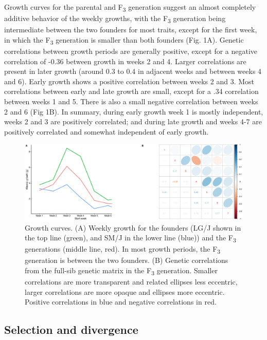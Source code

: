 \begin{refsection}
Growth curves for the parental and F\textsubscript{3} generation suggest
an almost completely additive behavior of the weekly growths, with the
F\textsubscript{3} generation being intermediate between the two
founders for most traits, except for the first week, in which the
F\textsubscript{3} generation is smaller than both founders (Fig. 1A).
Genetic correlations between growth periods are generally positive,
except for a negative correlation of -0.36 between growth in weeks 2 and
4. Larger correlations are present in later growth (around 0.3 to 0.4 in
adjacent weeks and between weeks 4 and 6). Early growth shows a positive
correlation between weeks 2 and 3. Most correlations between early and
late growth are small, except for a .34 correlation between weeks 1 and
5. There is also a small negative correlation between weeks 2 and 6 (Fig
1B). In summary, during early growth week 1 is mostly
independent, weeks 2 and 3 are positively correlated; and during late
growth and weeks 4-7 are positively correlated and somewhat independent
of early growth.

\begin{figure}
\includegraphics[width=\linewidth]{chapter_JoH-Melo_etal/media/growth_LG_SM_F3_covF3.eps}
\caption[Growth curves]{Growth curves. (A) Weekly growth for the founders (LG/J
shown in the top line (green), and SM/J in the lower line (blue)) and the
F\textsubscript{3} generations (middle line, red). In most growth periods,
the F\textsubscript{3} generation is between the two founders. (B)
Genetic correlations from the full-sib genetic matrix in the
F\textsubscript{3} generation. Smaller correlations are more transparent
and related ellipses less eccentric, larger correlations are more opaque
and ellipses more eccentric. Positive correlations in blue and negative
correlations in red.}
\end{figure}

\subsection{Selection and divergence}


\end{refsection}
